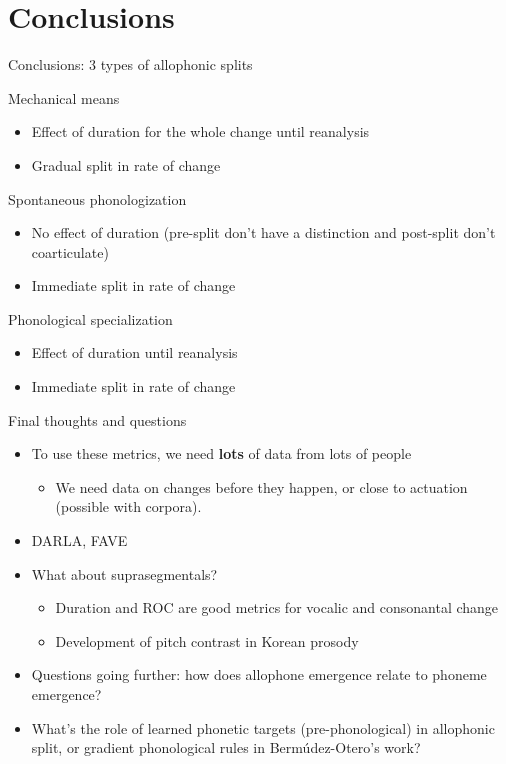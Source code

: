\documentclass[hyperref={pdfpagelabels=false}]{beamer}
\begin{document}
\section{Conclusions}

\begin{frame}{Conclusions: 3 types of allophonic splits}
	\begin{block}{Mechanical means}
		\begin{itemize}
			\item Effect of duration for the whole change until reanalysis
			\item Gradual split in rate of change \pause
		\end{itemize}
	\end{block}
	
	\begin{block}{Spontaneous phonologization}
		\begin{itemize}
			\item No effect of duration (pre-split don't have a distinction and post-split don't coarticulate)
			\item Immediate split in rate of change \pause
		\end{itemize}
	\end{block}
	
	\begin{block}{Phonological specialization}
		\begin{itemize}
			\item Effect of duration until reanalysis
			\item Immediate split in rate of change 
		\end{itemize}
	\end{block}
\end{frame}

\begin{frame}{Final thoughts and questions}
	\begin{itemize}
		\item To use these metrics, we need \textbf{lots} of data from lots of people \pause
			\begin{itemize}
			\item We need data on changes before they happen, or close to actuation (possible with corpora). \pause
			\end{itemize}
		\item DARLA, FAVE \pause
		\item What about suprasegmentals?
			\begin{itemize}
			\item Duration and ROC are good metrics for vocalic and consonantal change \pause
			\item \cite{Cho2015} Development of pitch contrast in Korean prosody \pause 
			\end{itemize}		
		\item Questions going further: how does allophone emergence relate to phoneme emergence?
		\item What's the role of learned phonetic targets (pre-phonological) in allophonic split, or gradient phonological rules in Bermúdez-Otero's work?
	\end{itemize}
\end{frame}
\end{document}
